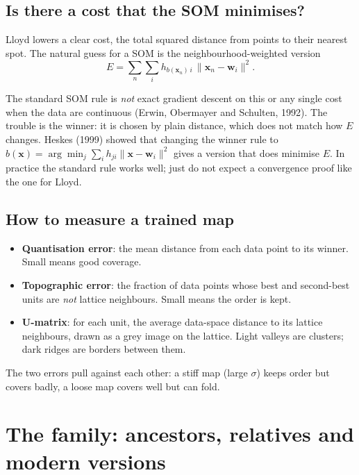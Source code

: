 \documentclass[11pt,a4paper]{article}
\newcommand{\vect}[1]{\mathbf{#1}}
\newcommand{\x}{\vect{x}}
\newcommand{\w}{\vect{w}}
\begin{document}
\subsection{Is there a cost that the SOM minimises?}
Lloyd lowers a clear cost, the total squared distance from points to their nearest spot. The natural guess for a SOM
is the neighbourhood-weighted version
\[
E=\sum_n\sum_i h_{b(\x_n)\,i}\,\|\x_n-\w_i\|^2 .
\]
\begin{watchbox}
The standard SOM rule is \emph{not} exact gradient descent on this or any single cost when the data are continuous
(Erwin, Obermayer and Schulten, 1992). The trouble is the winner: it is chosen by plain distance, which does not
match how $E$ changes. Heskes (1999) showed that changing the winner rule to
$b(\x)=\arg\min_j\sum_i h_{ji}\|\x-\w_i\|^2$ gives a version that does minimise $E$. In practice the standard rule
works well; just do not expect a convergence proof like the one for Lloyd.
\end{watchbox}

\subsection{How to measure a trained map}
\begin{itemize}[leftmargin=*]
\item \textbf{Quantisation error}: the mean distance from each data point to its winner. Small means good coverage.
\item \textbf{Topographic error}: the fraction of data points whose best and second-best units are \emph{not} lattice
neighbours. Small means the order is kept.
\item \textbf{U-matrix}: for each unit, the average data-space distance to its lattice neighbours, drawn as a grey
image on the lattice. Light valleys are clusters; dark ridges are borders between them.
\end{itemize}
The two errors pull against each other: a stiff map (large $\sigma$) keeps order but covers badly, a loose map covers
well but can fold.

\section{The family: ancestors, relatives and modern versions}
\end{document}
